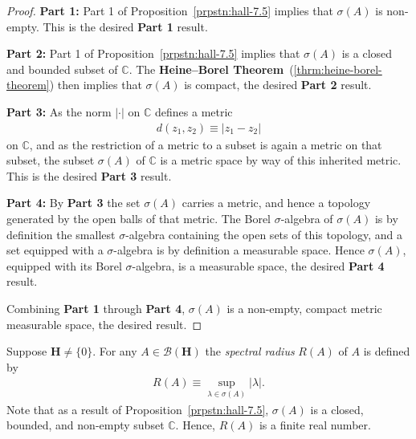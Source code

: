 \begin{proof}
    \leanok
\textbf{Part 1:} Part 1 of Proposition~\ref{prpstn:hall-7.5} implies that $\sigma(A)$ is non-empty. This is the desired \textbf{Part 1} result.

\textbf{Part 2:} Part 1 of Proposition~\ref{prpstn:hall-7.5} implies that $\sigma(A)$ is a closed and bounded subset of $\mathbb{C}$. The \textbf{Heine–Borel Theorem}~(\ref{thrm:heine-borel-theorem}) then implies that $\sigma(A)$ is compact, the desired \textbf{Part 2} result.

\textbf{Part 3:} As the norm $\lvert \cdot \rvert$ on $\mathbb{C}$ defines a metric
\begin{align}
    d(z_1, z_2) \equiv \lvert z_1 - z_2 \rvert
\end{align}
on $\mathbb{C}$, and as the restriction of a metric to a subset is again a metric on that subset, the subset $\sigma(A)$ of $\mathbb{C}$ is a metric space by way of this inherited metric. This is the desired \textbf{Part 3} result.

\textbf{Part 4:} By \textbf{Part 3} the set $\sigma(A)$ carries a metric, and hence a topology generated by the open balls of that metric. The Borel $\sigma$-algebra of $\sigma(A)$ is by definition the smallest $\sigma$-algebra containing the open sets of this topology, and a set equipped with a $\sigma$-algebra is by definition a measurable space. Hence $\sigma(A)$, equipped with its Borel $\sigma$-algebra, is a measurable space, the desired \textbf{Part 4} result.

Combining \textbf{Part 1} through \textbf{Part 4}, $\sigma(A)$ is a non-empty, compact metric measurable space, the desired result.
\end{proof}

\begin{definition}
    \label{def:spectral-radius}
    \leanok
    Suppose $\mathbf{H} \ne \{0\}$. For any $A \in \mathcal{B}(\mathbf{H})$ the \textit{spectral radius} $R(A)$ of $A$ is defined by
    \begin{align}
        R(A) \equiv \sup\limits_{\lambda \in \sigma(A)} \lvert \lambda \rvert.
    \end{align}
    Note that as a result of Proposition~\ref{prpstn:hall-7.5}, $\sigma(A)$ is a closed, bounded, and non-empty subset $\mathbb{C}$. Hence, $R(A)$ is a finite real number.
\end{definition}


